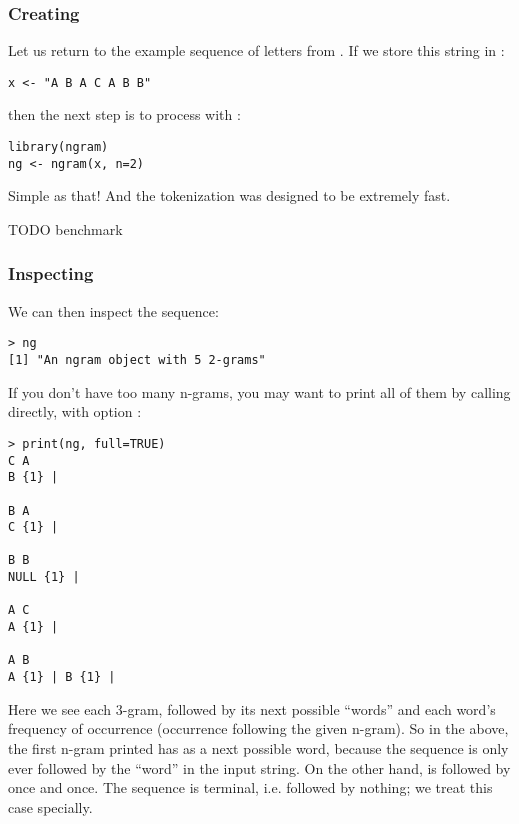 \subsubsection{Creating}

Let us return to the example sequence of letters from .  If 
we store this string in :

\begin{lstlisting}[language=rr]
x <- "A B A C A B B"
\end{lstlisting}

then the next step is to process with :

\begin{lstlisting}[language=rr]
library(ngram)
ng <- ngram(x, n=2)
\end{lstlisting}

Simple as that!  And the tokenization was designed to be extremely fast.

TODO benchmark



\subsubsection{Inspecting}

We can then inspect the sequence:

\begin{lstlisting}[language=inteRactive]
> ng
[1] "An ngram object with 5 2-grams"
\end{lstlisting}

If you don't have too many n-grams, you may want to print all of them by 
calling 
 directly, with option :
\begin{lstlisting}[language=inteRactive]
> print(ng, full=TRUE)
C A 
B {1} | 

B A 
C {1} | 

B B 
NULL {1} | 

A C 
A {1} | 

A B 
A {1} | B {1} | 
\end{lstlisting}

Here we see each 3-gram, followed by its next possible ``words'' and each 
word's frequency of occurrence (occurrence following the given n-gram).  So in 
the above, the first n-gram printed  has  as a next 
possible word, because the sequence  is only ever followed by the 
``word''  in the input string.  On the other hand,  is 
followed by  once and  once.  The sequence  is 
terminal, i.e. followed by nothing; we treat this case specially.



